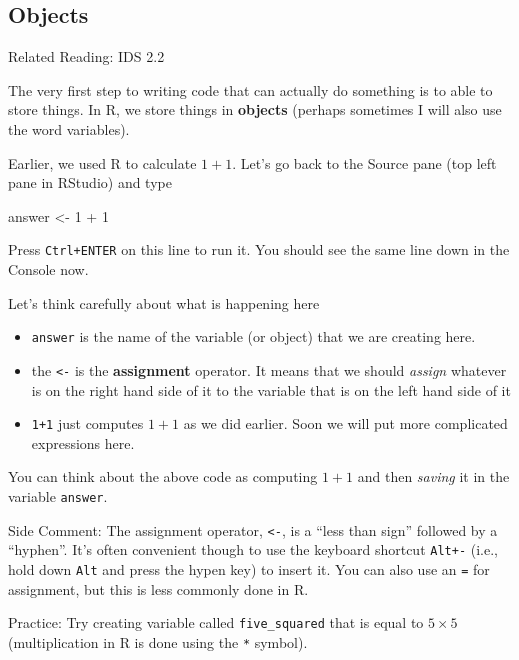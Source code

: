 \documentclass[
  letterpaper,
  DIV=11,
  numbers=noendperiod]{scrreprt}
\newenvironment{Shaded}{\begin{snugshade}}{\end{snugshade}}
\newcommand{\DecValTok}[1]{\textcolor[rgb]{0.68,0.00,0.00}{#1}}
\newcommand{\NormalTok}[1]{\textcolor[rgb]{0.00,0.23,0.31}{#1}}
\newcommand{\OtherTok}[1]{\textcolor[rgb]{0.00,0.23,0.31}{#1}}
\newcommand{\SpecialCharTok}[1]{\textcolor[rgb]{0.37,0.37,0.37}{#1}}
\begin{document}
\subsection{Objects}\label{objects}

Related Reading: IDS 2.2

The very first step to writing code that can actually do something is to
able to store things. In R, we store things in \textbf{objects} (perhaps
sometimes I will also use the word variables).

Earlier, we used R to calculate \(1+1\). Let's go back to the Source
pane (top left pane in RStudio) and type

\begin{Shaded}
\begin{Highlighting}[]
\NormalTok{answer }\OtherTok{\textless{}{-}} \DecValTok{1} \SpecialCharTok{+} \DecValTok{1}
\end{Highlighting}
\end{Shaded}

Press \texttt{Ctrl+ENTER} on this line to run it. You should see the
same line down in the Console now.

Let's think carefully about what is happening here

\begin{itemize}
\item
  \texttt{answer} is the name of the variable (or object) that we are
  creating here.
\item
  the \texttt{\textless{}-} is the \textbf{assignment} operator. It
  means that we should \emph{assign} whatever is on the right hand side
  of it to the variable that is on the left hand side of it
\item
  \texttt{1+1} just computes \(1+1\) as we did earlier. Soon we will put
  more complicated expressions here.
\end{itemize}

You can think about the above code as computing \(1+1\) and then
\emph{saving} it in the variable \texttt{answer}.

{Side Comment:} The assignment operator, \texttt{\textless{}-}, is a
``less than sign'' followed by a ``hyphen''. It's often convenient
though to use the keyboard shortcut \texttt{Alt+-} (i.e., hold down
\texttt{Alt} and press the hypen key) to insert it. You can also use an
\texttt{=} for assignment, but this is less commonly done in R.

{Practice:} Try creating variable called \texttt{five\_squared} that is
equal to \(5 \times 5\) (multiplication in R is done using the
\texttt{*} symbol).
\end{document}
